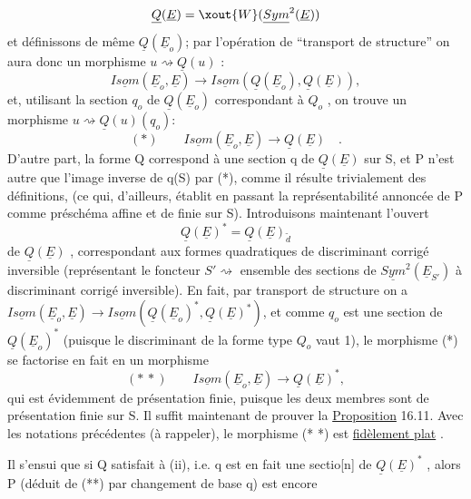 
\[ \underline{Q}(\underline{E}) =\xout{W}(\underline{Sym}^2(\underline{E})) \]
et définissons de même $\underline{Q}(\underline{E}_o)$; par l'opération de ``transport de
structure'' on aura donc un morphisme $u \rightsquigarrow \underline{Q}(u)$ :
\[ \underline{Isom}(\underline{E}_o,\underline{E}) \longrightarrow \underline{Isom}(\underline{Q}(\underline{E}_o),\underline{Q}(\underline{E})), \]
et, utilisant la section $q_o$ de $\underline{Q}(\underline{E}_o)$ correspondant à $Q_o$ , on trouve un
morphisme $u \rightsquigarrow \underline{Q}(u)(q_o)$:
\[ (*) \qquad \underline{Isom}(\underline{E}_o,\underline{E}) \longrightarrow \underline{Q}(\underline{E}) \quad . \]
D'autre part, la forme Q  correspond à une section q de $\underline{Q}(\underline{E})$ sur S,
et P n'est autre que l'image inverse de q(S) par (*), comme il résulte
trivialement des définitions, (ce qui, d'ailleurs, établit en passant la
représentabilité annoncée de P comme préschéma affine et de  finie
sur S). Introduisons maintenant l'ouvert 
\[ \underline{Q}(\underline{E})^* = \underline{Q}(\underline{E})_{\tilde{d}} \]
de $\underline{Q}(\underline{E})$ , correspondant aux formes quadratiques de discriminant corrigé
inversible (représentant le foncteur $S' \rightsquigarrow$ ensemble des 
sections de $\underline{Sym}^2(\underline{E}_{S'})$ à discriminant corrigé inversible). En fait,
par transport de structure on a $\underline{Isom}(\underline{E}_o,\underline{E}) \rightarrow \underline{Isom}(\underline{Q}(\underline{E}_o)^*,\underline{Q}(\underline{E})^*)$, et
comme $q_o$ est une section de $\underline{Q}(\underline{E}_o)^*$ (puisque le discriminant  de
la forme type $Q_o$ vaut 1), le morphisme (*) se factorise en fait en un
morphisme
\[ (*\,*) \qquad \underline{Isom}(\underline{E}_o,\underline{E}) \rightarrow \underline{Q}(\underline{E})^* , \]
qui est évidemment de présentation finie, puisque les deux membres sont de
présentation finie sur S. Il suffit maintenant de prouver la
 \uline{Proposition} 16.11. Avec les notations précédentes (à rappeler),
le morphisme (* *) est \uline{fidèlement plat} .

Il s'ensui que si Q satisfait à (ii), i.e.  q est en fait une sectio[n]
de $\underline{Q}(\underline{E})^*$\hand{\unsure{$\hat{}$}} , alors P (déduit de (**) par  changement de base q) est encore

